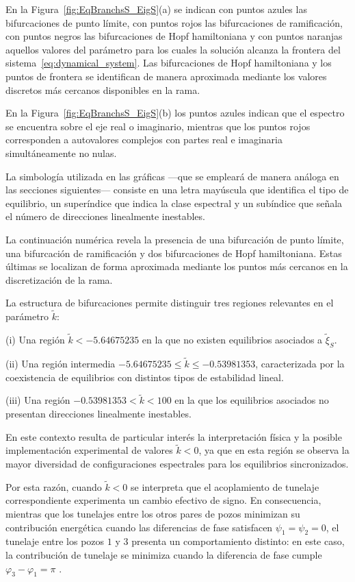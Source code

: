 En la Figura~\ref{fig:EqBranchsS_EigS}(a) se indican con puntos azules las bifurcaciones de punto límite, con puntos rojos las bifurcaciones de ramificación, con puntos negros las bifurcaciones de Hopf hamiltoniana y con puntos naranjas aquellos valores del parámetro para los cuales la solución alcanza la frontera del sistema~\eqref{eq:dynamical_system}. Las bifurcaciones de Hopf hamiltoniana y los puntos de frontera se identifican de manera aproximada mediante los valores discretos más cercanos disponibles en la rama.

En la Figura~\ref{fig:EqBranchsS_EigS}(b) los puntos azules indican que el espectro se encuentra sobre el eje real o imaginario, mientras que los puntos rojos corresponden a autovalores complejos con partes real e imaginaria simultáneamente no nulas.

La simbología utilizada en las gráficas —que se empleará de manera análoga en las secciones siguientes— consiste en una letra mayúscula que identifica el tipo de equilibrio, un superíndice que indica la clase espectral y un subíndice que señala el número de direcciones linealmente inestables.

La continuación numérica revela la presencia de una bifurcación de punto límite, una bifurcación de ramificación y dos bifurcaciones de Hopf hamiltoniana. Estas últimas se localizan de forma aproximada mediante los puntos más cercanos en la discretización de la rama.

La estructura de bifurcaciones permite distinguir tres regiones relevantes en el parámetro $\tilde{k}$:

(i) Una región $\tilde{k} < -5.64675235$ en la que no existen equilibrios asociados a $\tilde{\xi}_{S}$.

(ii) Una región intermedia $-5.64675235 \leq \tilde{k} \leq -0.53981353$, caracterizada por la coexistencia de equilibrios con distintos tipos de estabilidad lineal.

(iii) Una región $-0.53981353 < \tilde{k} < 100$ en la que los equilibrios asociados no presentan direcciones linealmente inestables.

En este contexto resulta de particular interés la interpretación física y la posible implementación experimental de valores $\tilde{k}<0$, ya que en esta región se observa la mayor diversidad de configuraciones espectrales para los equilibrios sincronizados.

Por esta razón, cuando $\tilde{k}<0$ se interpreta que el acoplamiento de tunelaje correspondiente experimenta un cambio efectivo de signo. En consecuencia, mientras que los tunelajes entre los otros pares de pozos minimizan su contribución energética cuando las diferencias de fase satisfacen $\psi_1=\psi_2=0$, el tunelaje entre los pozos $1$ y $3$ presenta un comportamiento distinto: en este caso, la contribución de tunelaje se minimiza cuando la diferencia de fase cumple $\varphi_3-\varphi_1=\pi$ \cite{gallemi2015fragmented}.


